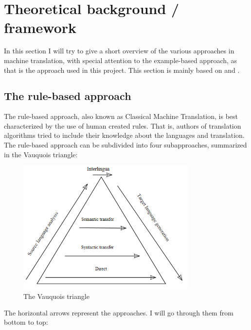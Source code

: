 \documentclass[12pt]{article}
\begin{document}
\section{Theoretical background / framework}

In this section I will try to give a short overview of the various approaches in machine translation, with special attention to the example-based approach, as that is the approach used in this project. This section is mainly based on \citet{jm09} and \citet{vangompel09}.

\subsection{The rule-based approach}

The rule-based approach, also known as Classical Machine Translation, is best characterized by the use of human created rules. That is, authors of translation algorithms tried to include their knowledge about the languages and translation. The rule-based approach can be subdivided into four subapproaches, summarized in the Vauquois triangle: \\

\begin{figure}[htb]
\centering
\includegraphics[width=0.8\textwidth]{vauquois.png}
\caption{The Vauquois triangle}
\label{fig:vauquois}
\end{figure}

The horizontal arrows represent the approaches. I will go through them from bottom to top:
\end{document}
